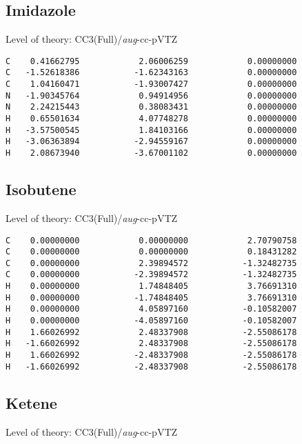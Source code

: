 \documentclass[journal=jctcce,manuscript=article,layout=traditional]{achemso}
\newcommand{\AVTZ}{\emph{aug}-cc-pVTZ}
\begin{document}
\subsection*{Imidazole}

\begin{singlespace}
Level of theory: CC3(Full)/{\AVTZ}
\begin{verbatim}
C    0.41662795            2.06006259            0.00000000
C   -1.52618386           -1.62343163            0.00000000  
C    1.04160471           -1.93007427            0.00000000
N   -1.90345764            0.94914956            0.00000000
N    2.24215443            0.38083431            0.00000000  
H    0.65501634            4.07748278            0.00000000 
H   -3.57500545            1.84103166            0.00000000  
H   -3.06363894           -2.94559167            0.00000000 
H    2.08673940           -3.67001102            0.00000000 
\end{verbatim}
\end{singlespace}

\subsection*{Isobutene}

\begin{singlespace}
Level of theory: CC3(Full)/{\AVTZ}
\begin{verbatim}
C    0.00000000            0.00000000            2.70790758
C    0.00000000            0.00000000            0.18431282
C    0.00000000            2.39894572           -1.32482735
C    0.00000000           -2.39894572           -1.32482735
H    0.00000000            1.74848405            3.76691310
H    0.00000000           -1.74848405            3.76691310
H    0.00000000            4.05897160           -0.10582007
H    0.00000000           -4.05897160           -0.10582007
H    1.66026992            2.48337908           -2.55086178
H   -1.66026992            2.48337908           -2.55086178
H    1.66026992           -2.48337908           -2.55086178
H   -1.66026992           -2.48337908           -2.55086178
\end{verbatim}
\end{singlespace}

\subsection*{Ketene}

\begin{singlespace}
Level of theory: CC3(Full)/{\AVTZ}
\end{singlespace}
\end{document}
